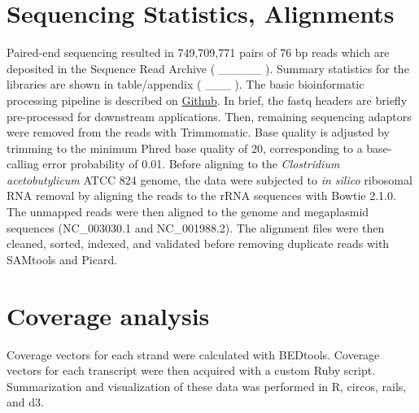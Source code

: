 \section{Sequencing Statistics, Alignments}
Paired-end sequencing resulted in 749,709,771 pairs of 76 bp reads which are deposited in the Sequence Read Archive ( _____ ). Summary statistics for the libraries are shown in table/appendix ( ___ ). The basic bioinformatic processing pipeline is described on \href{https://github.com/MatthewRalston/NGS_scripts}{Github}. In brief, the fastq headers are briefly pre-processed for downstream applications. Then, remaining sequencing adaptors were removed from the reads with Trimmomatic\cite{47}. Base quality is adjusted by trimming to the minimum Phred base quality of 20, corresponding to a base-calling error probability of 0.01. Before aligning to the \textit{Clostridium acetobutylicum} ATCC 824 genome, the data were subjected to \textit{in silico} ribosomal RNA removal by aligning the reads to the rRNA sequences with Bowtie 2.1.0\cite{17}. The unmapped reads were then aligned to the genome and megaplasmid sequences (NC_003030.1 and NC_001988.2). The alignment files were then cleaned, sorted, indexed, and validated before removing duplicate reads with SAMtools\cite{19} and Picard\cite{40}.

\section{Coverage analysis}
Coverage vectors for each strand were calculated with BEDtools\cite{49}. Coverage vectors for each transcript were then acquired with a custom Ruby script. Summarization and visualization of these data was performed in R\cite{59}, circos, rails, and d3.


